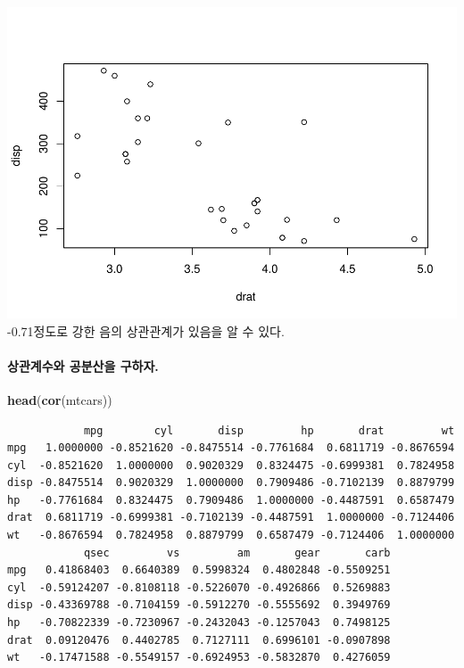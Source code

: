 \documentclass[]{article}
\newenvironment{Shaded}{\begin{snugshade}}{\end{snugshade}}
\newcommand{\KeywordTok}[1]{\textcolor[rgb]{0.13,0.29,0.53}{\textbf{#1}}}
\newcommand{\NormalTok}[1]{#1}
\let\oldparagraph\paragraph
\renewcommand{\paragraph}[1]{\oldparagraph{#1}\mbox{}}
\begin{document}
\includegraphics{04.02.01.basic_statistical_analysis_files/figure-latex/unnamed-chunk-3-1.pdf}
-0.71정도로 강한 음의 상관관계가 있음을 알 수 있다.

\paragraph{상관계수와 공분산을 구하자.}\label{--.}

\begin{Shaded}
\begin{Highlighting}[]
\KeywordTok{head}\NormalTok{(}\KeywordTok{cor}\NormalTok{(mtcars))}
\end{Highlighting}
\end{Shaded}

\begin{verbatim}
            mpg        cyl       disp         hp       drat         wt
mpg   1.0000000 -0.8521620 -0.8475514 -0.7761684  0.6811719 -0.8676594
cyl  -0.8521620  1.0000000  0.9020329  0.8324475 -0.6999381  0.7824958
disp -0.8475514  0.9020329  1.0000000  0.7909486 -0.7102139  0.8879799
hp   -0.7761684  0.8324475  0.7909486  1.0000000 -0.4487591  0.6587479
drat  0.6811719 -0.6999381 -0.7102139 -0.4487591  1.0000000 -0.7124406
wt   -0.8676594  0.7824958  0.8879799  0.6587479 -0.7124406  1.0000000
            qsec         vs         am       gear       carb
mpg   0.41868403  0.6640389  0.5998324  0.4802848 -0.5509251
cyl  -0.59124207 -0.8108118 -0.5226070 -0.4926866  0.5269883
disp -0.43369788 -0.7104159 -0.5912270 -0.5555692  0.3949769
hp   -0.70822339 -0.7230967 -0.2432043 -0.1257043  0.7498125
drat  0.09120476  0.4402785  0.7127111  0.6996101 -0.0907898
wt   -0.17471588 -0.5549157 -0.6924953 -0.5832870  0.4276059
\end{verbatim}
\end{document}
